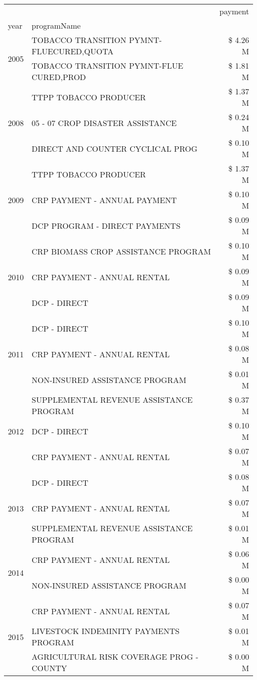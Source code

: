 \begin{tabular}{llr}
\toprule
 &  & payment \\
year & programName &  \\
\midrule
\multirow[t]{2}{*}{2005} & TOBACCO TRANSITION PYMNT-FLUECURED,QUOTA & \$ 4.26 M \\
 & TOBACCO TRANSITION PYMNT-FLUE CURED,PROD & \$ 1.81 M \\
\cline{1-3}
\multirow[t]{3}{*}{2008} & TTPP TOBACCO PRODUCER & \$ 1.37 M \\
 & 05 - 07 CROP DISASTER ASSISTANCE & \$ 0.24 M \\
 & DIRECT AND COUNTER CYCLICAL PROG & \$ 0.10 M \\
\cline{1-3}
\multirow[t]{3}{*}{2009} & TTPP TOBACCO PRODUCER & \$ 1.37 M \\
 & CRP PAYMENT - ANNUAL PAYMENT & \$ 0.10 M \\
 & DCP PROGRAM - DIRECT PAYMENTS & \$ 0.09 M \\
\cline{1-3}
\multirow[t]{3}{*}{2010} & CRP BIOMASS CROP ASSISTANCE PROGRAM & \$ 0.10 M \\
 & CRP PAYMENT - ANNUAL RENTAL & \$ 0.09 M \\
 & DCP - DIRECT & \$ 0.09 M \\
\cline{1-3}
\multirow[t]{3}{*}{2011} & DCP - DIRECT & \$ 0.10 M \\
 & CRP PAYMENT - ANNUAL RENTAL & \$ 0.08 M \\
 & NON-INSURED ASSISTANCE PROGRAM & \$ 0.01 M \\
\cline{1-3}
\multirow[t]{3}{*}{2012} & SUPPLEMENTAL REVENUE ASSISTANCE PROGRAM & \$ 0.37 M \\
 & DCP - DIRECT & \$ 0.10 M \\
 & CRP PAYMENT - ANNUAL RENTAL & \$ 0.07 M \\
\cline{1-3}
\multirow[t]{3}{*}{2013} & DCP - DIRECT & \$ 0.08 M \\
 & CRP PAYMENT - ANNUAL RENTAL & \$ 0.07 M \\
 & SUPPLEMENTAL REVENUE ASSISTANCE PROGRAM & \$ 0.01 M \\
\cline{1-3}
\multirow[t]{2}{*}{2014} & CRP PAYMENT - ANNUAL RENTAL & \$ 0.06 M \\
 & NON-INSURED ASSISTANCE PROGRAM & \$ 0.00 M \\
\cline{1-3}
\multirow[t]{3}{*}{2015} & CRP PAYMENT - ANNUAL RENTAL & \$ 0.07 M \\
 & LIVESTOCK INDEMINITY PAYMENTS PROGRAM & \$ 0.01 M \\
 & AGRICULTURAL RISK COVERAGE PROG - COUNTY & \$ 0.00 M \\

\end{tabular}
